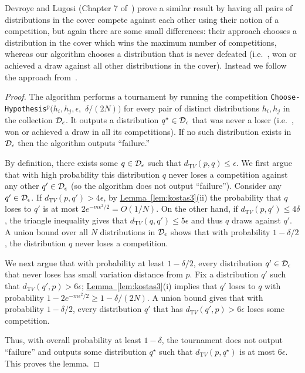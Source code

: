 \documentclass[10pt]{article}
\theoremstyle{definition}
\providecommand{\ie}{i.e.\ }
\numberwithin{equation}{section}
\newcommand{\expref}[2]{\texorpdfstring{\hyperref[#2]{#1~\ref{#2}}}{#1~\ref{#2}}}
\newcommand{\algorithml}[1]{{\normalfont\texttt{#1}}}
\newcommand{\dtv}{d_{\mathrm TV}}
\newcommand{\eps}{\epsilon}
\begin{document}
Devroye and Lugosi (Chapter 7 of~\cite{DL:01}) prove a similar result by having all pairs
of distributions in the cover compete against each other using their notion of a competition, but again there
are some small differences:  their approach chooses a distribution in the cover which wins the
maximum number of competitions, whereas our algorithm chooses
a distribution that is never defeated (\ie, won or achieved a draw against all other distributions
in the cover).  Instead we follow the approach from~\cite{DDS12stoclong}.

\medskip

\begin{proof}
The algorithm %
performs a tournament by running the competition
\algorithml{Choose-Hypothesis}$^p(h_i,h_j,\eps,$ $\delta/(2N))$ for every pair of distinct distributions
$h_i,h_j$ in the collection ${\cal D}_\eps$.  It outputs a distribution $q^{\star} \in {\cal D}_\eps$
that was never a loser (\ie, won or achieved a draw in all its competitions).
If no such distribution exists in ${\cal D}_\eps$ then the algorithm outputs
``failure.''

By definition, there exists some $q \in {\cal D}_\eps$ such that $\dtv(p,q) \leq \eps$.
We first argue that with high probability this distribution $q$ never
loses a competition against any other $q' \in {\cal D}_\eps$
(so the algorithm does not output ``failure'').  Consider any $q'
\in {\cal D}_\eps$. If $\dtv(p, q') > 4 \eps$, by \expref{Lemma}{lem:kostas3}(ii) the probability that $q$ loses to
$q'$ is at most $2e^{-m \eps^2 /2} = O(1/N)$. On the other hand, if $\dtv(p, q') \leq 4 \delta$, the triangle
inequality gives that $\dtv(q,q') \leq 5 \eps$ and thus $q$ draws against $q'$.  A union
bound over all $N$ distributions in ${\cal D}_{\eps}$ shows that with probability $1-\delta/2$, the distribution $q$ never loses a competition.

We next argue that with probability at least $1-\delta/2$, every distribution $q' \in {\cal D}_\eps$ that never loses has small variation distance from $p$. Fix a distribution $q'$ such that $\dtv(q',p) > 6 \eps$; \expref{Lemma}{lem:kostas3}(i) implies that $q'$ loses to $q$ with probability $1 - 2e^{-m \eps^2 /2} \geq 1 - \delta/(2N)$.  A union bound gives that with probability $1-\delta/2$, every distribution $q'$ that has $\dtv(q', p) > 6 \eps$ loses some competition.

Thus, with overall probability at least $1-\delta$, the tournament does not output ``failure'' and outputs some distribution $q^{\star}$ such that $\dtv(p, q^{\star})$ is at most $6 \eps$.
This proves the lemma.
\end{proof}
\end{document}
